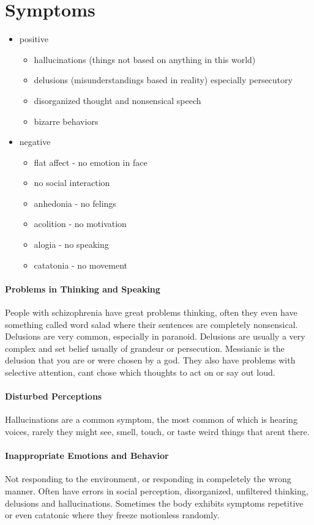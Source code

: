 \documentclass[12pt]{article}
\begin{document}
\section*{Symptoms}
\begin{itemize}
\item positive
\begin{itemize}
\item hallucinations (things not based on anything in this world)
\item delusions (misunderstandings based in reality) especially persecutory
\item disorganized thought and nonsensical speech
\item bizarre behaviors
\end{itemize}
\item negative
\begin{itemize}
\item flat affect - no emotion in face
\item no social interaction
\item anhedonia - no felings
\item acolition - no motivation
\item alogia - no speaking
\item catatonia - no movement
\end{itemize}
\end{itemize}

\paragraph*{Problems in Thinking and Speaking}
People with schizophrenia have great problems thinking, often they even have something called word salad where their sentences are completely nonsensical. Delusions are very common, especially in paranoid. Delusions are usually a very complex and set belief usually of grandeur or persecution. Messianic is the delusion that you are or were chosen by a god. They also have problems with selective attention, cant chose which thoughts to act on or say out loud. 
\paragraph*{Disturbed Perceptions}
Hallucinations are a common symptom, the most common of which is hearing voices, rarely they might see, smell, touch, or taste weird things that arent there. 
\paragraph*{Inappropriate Emotions and Behavior}
Not responding to the environment, or responding in compeletely the wrong manner. Often have errors in social perception, disorganized, unfiltered thinking, delusions and hallucinations. Sometimes the body exhibits symptoms repetitive or even catatonic where they freeze motionless randomly.
\end{document}
